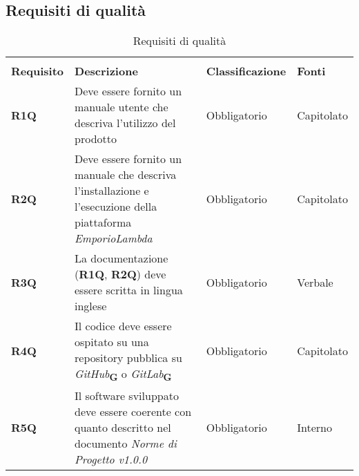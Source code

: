 \subsection{Requisiti di qualità}
\begin{center}
    \centering
    \renewcommand{\arraystretch}{1.8}
    \label{tab:RequisitiQualita}
    \begin{longtable}[!h]{p{50px} p{200px} p{100px} p{50px}}
        \rowcolor{white}\caption{Requisiti di qualità}                                                                                                                                                                                                                           \\
        \rowcolor{logo!70} \textbf{Requisito} & \textbf{Descrizione}                                                                                                                                                            & \textbf{Classificazione} & \textbf{Fonti}      \\
        \textbf{R1Q}                          & Deve essere fornito un manuale utente che descriva l'utilizzo del prodotto                                                                                                      & Obbligatorio             & Capitolato          \\
        \textbf{R2Q}                          & Deve essere fornito un manuale che descriva l'installazione e l'esecuzione della piattaforma \textit{EmporioLambda}                                                             & Obbligatorio             & Capitolato          \\
        \textbf{R3Q}                          & La documentazione (\textbf{R1Q}, \textbf{R2Q}) deve essere scritta in lingua inglese                                                                                            & Obbligatorio             & Verbale             \\
        \textbf{R4Q}                          & Il codice deve essere ospitato su una repository pubblica su \textit{GitHub}\textsubscript{\textbf{G}} o \textit{GitLab}\textsubscript{\textbf{G}}                              & Obbligatorio             & Capitolato          \\
        \textbf{R5Q}                          & Il software sviluppato deve essere coerente con quanto descritto nel documento \textit{Norme di Progetto v1.0.0}                                                                & Obbligatorio             & Interno             \\

\end{longtable}
\end{center}
